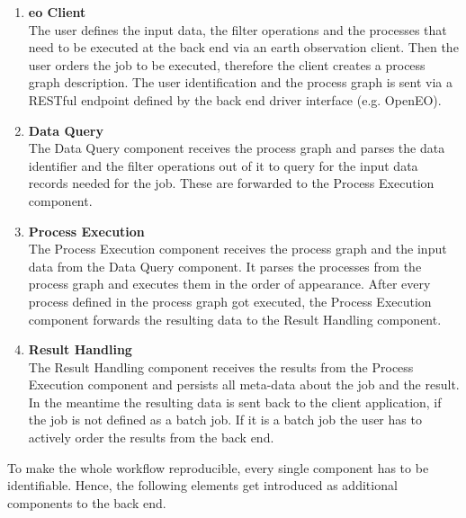 \documentclass[draft,final]{vutinfth} %
\begin{document}
 \begin{enumerate}
	\item \textbf{\gls{eo} Client} \\
	The user defines the input data, the filter operations and the processes that need to be executed at the back end via an earth observation client. Then the user orders the job to be executed, therefore the client creates a process graph description. The user identification and the process graph is sent via a RESTful endpoint defined by the back end driver interface (e.g. OpenEO).  
	\item \textbf{Data Query} \\ 
	The Data Query component receives the process graph and parses the data identifier and the filter operations out of it to query for the input data records needed for the job. These are forwarded to the Process Execution component.  
	\item \textbf{Process Execution} \\
	The Process Execution component receives the process graph and the input data from the Data Query component. It parses the processes from the process graph and executes them in the order of appearance. After every process defined in the process graph got executed, the Process Execution component forwards the resulting data to the Result Handling component.   
	\item \textbf{Result Handling} \\ 
	The Result Handling component receives the results from the Process Execution component and persists all meta-data about the job and the result. In the meantime the resulting data is sent back to the client application, if the job is not defined as a batch job. If it is a batch job the user has to actively order the results from the back end.  
\end{enumerate}

To make the whole workflow reproducible, every single component has to be identifiable. Hence, the following elements get introduced as additional components to the back end.
\end{document}
